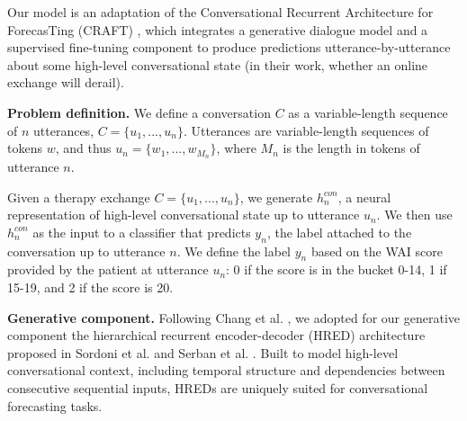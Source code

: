 \documentclass{article}
\begin{document}




Our model is an adaptation of the Conversational Recurrent Architecture for ForecasTing (CRAFT) \cite{Chang-Trouble:19}, which integrates a generative dialogue model and a supervised fine-tuning component to produce predictions utterance-by-utterance about some high-level conversational state (in their work, whether an online exchange will derail).

\textbf{Problem definition.} We define a conversation $C$ as a variable-length sequence of $n$ utterances, $C=\{u_1,...,u_n\}$. Utterances are variable-length sequences of tokens $w$, and thus $u_n=\{w_1,...,w_{M_n}\}$, where $M_n$ is the length in tokens of utterance $n$.

Given a therapy exchange $C=\{u_1,...,u_n\}$, we generate $h^{con}_n$, a neural representation of high-level conversational state up to utterance $u_n$. We then use $h^{con}_n$ as the input to a classifier that predicts $y_n$, the label attached to the conversation up to utterance $n$. We define the label $y_n$ based on the WAI score provided by the patient at utterance $u_n$: 0 if the score is in the bucket 0-14, 1 if 15-19, and 2 if the score is 20.

\textbf{Generative component.} Following Chang et al. \citeyear{Chang-Trouble:19}, we adopted for our generative component the hierarchical recurrent encoder-decoder (HRED) architecture proposed in Sordoni et al. \citeyear{sordoni2015hierarchical} and Serban et al. \citeyear{serban2016building}. Built to model high-level conversational context, including temporal structure and dependencies between consecutive sequential inputs, HREDs are uniquely suited for conversational forecasting tasks. 
\end{document}
